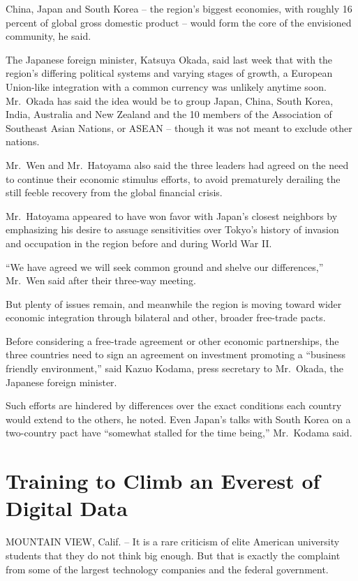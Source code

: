 ﻿\documentclass[12pt]{article}
\begin{document}
China, Japan and South Korea -- the region's biggest economies, with roughly 16 percent of global
gross domestic product -- would form the core of the envisioned community, he said.

The Japanese foreign minister, Katsuya Okada, said last week that with the region's differing
political systems and varying stages of growth, a European Union-like integration with a common
currency was unlikely anytime soon. Mr.~Okada has said the idea would be to group Japan, China,
South Korea, India, Australia and New Zealand and the 10 members of the Association of Southeast
Asian Nations, or ASEAN -- though it was not meant to exclude other nations.

Mr.~Wen and Mr.~Hatoyama also said the three leaders had agreed on the need to continue their
economic stimulus efforts, to avoid prematurely derailing the still feeble recovery from the global
financial crisis.

Mr.~Hatoyama appeared to have won favor with Japan's closest neighbors by emphasizing his desire to
assuage\cite{assuage} sensitivities over Tokyo's history of invasion and occupation in the region
before and during World War II.

``We have agreed we will seek common ground and shelve our differences,'' Mr.~Wen said after their
three-way meeting.

But plenty of issues remain, and meanwhile the region is moving toward wider economic integration
through bilateral and other, broader free-trade pacts.

Before considering a free-trade agreement or other economic partnerships, the three countries need
to sign an agreement on investment promoting a ``business friendly environment,'' said Kazuo Kodama,
press secretary to Mr.~Okada, the Japanese foreign minister.

Such efforts are hindered\cite{hinder} by differences over the exact conditions each country would
extend to the others, he noted. Even Japan's talks with South Korea on a two-country pact have
``somewhat stalled for the time being,'' Mr.~Kodama said.

\section{Training to Climb an Everest of Digital Data}

\lettrine{M}{OUNTAIN} VIEW, Calif. -- It is a rare criticism of elite
American university students that they do not think big enough. But that is exactly the complaint
from some of the largest technology companies and the federal government.
\end{document}
